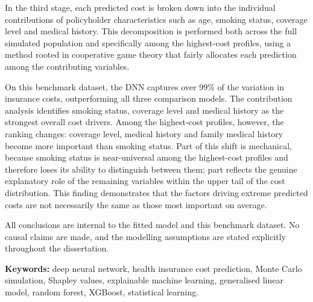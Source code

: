In the third stage, each predicted cost is broken down into the individual contributions of policyholder characteristics such as age, smoking status, coverage level and medical history.  This decomposition is performed both across the full simulated population and specifically among the highest-cost profiles, using a method rooted in cooperative game theory that fairly allocates each prediction among the contributing variables.

On this benchmark dataset, the DNN captures over 99\% of the variation in insurance costs, outperforming all three comparison models.  The contribution analysis identifies smoking status, coverage level and medical history as the strongest overall cost drivers.  Among the highest-cost profiles, however, the ranking changes: coverage level, medical history and family medical history become more important than smoking status.  Part of this shift is mechanical, because smoking status is near-universal among the highest-cost profiles and therefore loses its ability to distinguish between them; part reflects the genuine explanatory role of the remaining variables within the upper tail of the cost distribution.  This finding demonstrates that the factors driving extreme predicted costs are not necessarily the same as those most important on average.

All conclusions are internal to the fitted model and this benchmark dataset.  No causal claims are made, and the modelling assumptions are stated explicitly throughout the dissertation.

\vspace{4mm}

\noindent\textbf{Keywords:} deep neural network, health insurance cost prediction, Monte Carlo simulation, Shapley values, explainable machine learning, generalised linear model, random forest, XGBoost, statistical learning.
